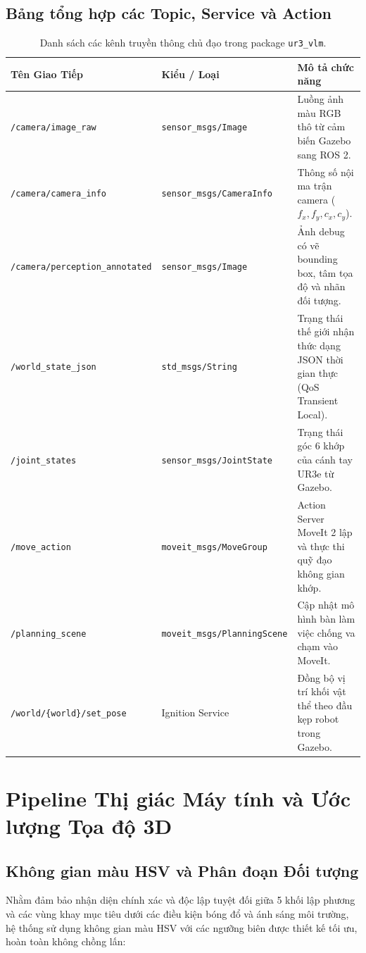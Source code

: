 \documentclass[a4paper,12pt]{article}
\begin{document}
\subsection{Bảng tổng hợp các Topic, Service và Action}
\begin{table}[H]\centering
\small
\begin{tabular}{p{4.2cm}p{3.0cm}p{6.8cm}}
\toprule
Tên Giao Tiếp & Kiểu / Loại & Mô tả chức năng\\
\midrule
\texttt{/camera/image\_raw} & \texttt{sensor\_msgs/Image} & Luồng ảnh màu RGB thô từ cảm biến Gazebo sang ROS 2.\\
\texttt{/camera/camera\_info} & \texttt{sensor\_msgs/CameraInfo} & Thông số nội ma trận camera ($f_x, f_y, c_x, c_y$).\\
\texttt{/camera/perception\_annotated} & \texttt{sensor\_msgs/Image} & Ảnh debug có vẽ bounding box, tâm tọa độ và nhãn đối tượng.\\
\texttt{/world\_state\_json} & \texttt{std\_msgs/String} & Trạng thái thế giới nhận thức dạng JSON thời gian thực (QoS Transient Local).\\
\texttt{/joint\_states} & \texttt{sensor\_msgs/JointState} & Trạng thái góc 6 khớp của cánh tay UR3e từ Gazebo.\\
\texttt{/move\_action} & \texttt{moveit\_msgs/MoveGroup} & Action Server MoveIt 2 lập và thực thi quỹ đạo không gian khớp.\\
\texttt{/planning\_scene} & \texttt{moveit\_msgs/PlanningScene} & Cập nhật mô hình bàn làm việc chống va chạm vào MoveIt.\\
\texttt{/world/\{world\}/set\_pose} & Ignition Service & Đồng bộ vị trí khối vật thể theo đầu kẹp robot trong Gazebo.\\
\bottomrule
\end{tabular}
\caption{Danh sách các kênh truyền thông chủ đạo trong package \texttt{ur3\_vlm}.}
\label{tab:ros_comms}
\end{table}

\section{Pipeline Thị giác Máy tính và Ước lượng Tọa độ 3D}

\subsection{Không gian màu HSV và Phân đoạn Đối tượng}
Nhằm đảm bảo nhận diện chính xác và độc lập tuyệt đối giữa 5 khối lập phương và các vùng khay mục tiêu dưới các điều kiện bóng đổ và ánh sáng môi trường, hệ thống sử dụng không gian màu HSV với các ngưỡng biên được thiết kế tối ưu, hoàn toàn không chồng lấn:
\end{document}
